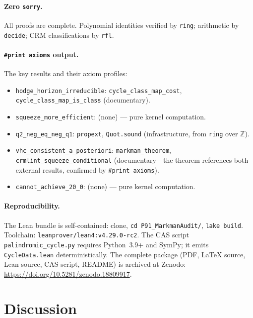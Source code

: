 \documentclass[11pt]{article}
\theoremstyle{plain}
\theoremstyle{definition}
\theoremstyle{remark}
\newcommand{\ZZ}{\mathbb{Z}}
\begin{document}
\paragraph{Zero \texttt{sorry}.}
All proofs are complete.  Polynomial identities verified by
\texttt{ring}; arithmetic by \texttt{decide}; CRM classifications
by \texttt{rfl}.

\paragraph{\texttt{\#print axioms} output.}
The key results and their axiom profiles:
\begin{itemize}[nosep]
\item \texttt{hodge\_horizon\_irreducible}: \texttt{cycle\_class\_map\_cost},
  \texttt{cycle\_class\_map\_is\_class} (documentary).
\item \texttt{squeeze\_more\_efficient}: (none) --- pure kernel
  computation.
\item \texttt{q2\_neg\_eq\_neg\_q1}: \texttt{propext},
  \texttt{Quot.sound} (infrastructure, from \texttt{ring} over $\ZZ$).
\item \texttt{vhc\_consistent\_a\_posteriori}:
  \texttt{markman\_theorem}, \texttt{crmlint\_squeeze\_conditional}
  (documentary---the theorem references both external results,
  confirmed by \texttt{\#print axioms}).
\item \texttt{cannot\_achieve\_20\_0}: (none) --- pure kernel
  computation.
\end{itemize}

\paragraph{Reproducibility.}
The Lean bundle is self-contained: clone, \texttt{cd P91\_MarkmanAudit/},
\texttt{lake build}.  Toolchain: \texttt{leanprover/lean4:v4.29.0-rc2}.
The CAS script \texttt{palindromic\_cycle.py} requires Python~3.9+ and
SymPy; it emits \texttt{CycleData.lean} deterministically.
The complete package (PDF, \LaTeX{} source, Lean source, CAS script,
README) is archived at Zenodo: \url{https://doi.org/10.5281/zenodo.18809917}.

\section{Discussion}\label{sec:discussion}
\end{document}

